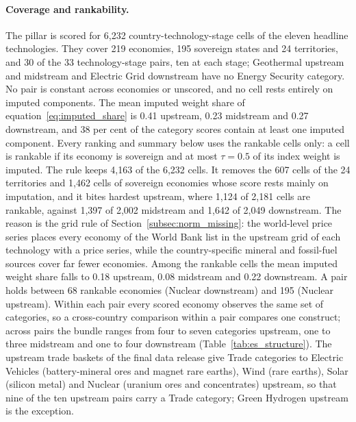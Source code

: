 
\paragraph{Coverage and rankability.} The pillar is scored for 6{,}232
country-technology-stage cells of the eleven headline technologies. They cover 219 economies,
195 sovereign states and 24 territories, and 30 of the 33 technology-stage pairs, ten at each
stage; Geothermal upstream and midstream and Electric Grid downstream have no Energy Security
category. No pair is constant across economies or unscored, and no cell rests entirely on
imputed components. The mean imputed weight share of equation~\eqref{eq:imputed_share} is 0.41
upstream, 0.23 midstream and 0.27 downstream, and 38 per cent of the category scores contain at
least one imputed component. Every ranking and summary below uses the rankable cells only: a
cell is rankable if its economy is sovereign and at most $\tau=0.5$ of its index weight is
imputed. The rule keeps 4{,}163 of the 6{,}232 cells. It removes the 607 cells of the 24
territories and 1{,}462 cells of sovereign economies whose score rests mainly on imputation, and
it bites hardest upstream, where 1{,}124 of 2{,}181 cells are rankable, against 1{,}397 of 2{,}002
midstream and 1{,}642 of 2{,}049 downstream. The reason is the grid rule of
Section~\ref{subsec:norm_missing}: the world-level price series places every economy of the
World Bank list in the upstream grid of each technology with a price series, while the
country-specific mineral and fossil-fuel sources cover far fewer economies. Among the rankable
cells the mean imputed weight share falls to 0.18 upstream, 0.08 midstream and 0.22 downstream.
A pair holds between 68 rankable economies (Nuclear downstream) and 195 (Nuclear upstream).
Within each pair every scored economy observes the same set of categories, so a cross-country
comparison within a pair compares one construct; across pairs the bundle ranges from four to
seven categories upstream, one to three midstream and one to four downstream
(Table~\ref{tab:es_structure}). The upstream trade baskets of the final data release give Trade
categories to Electric Vehicles (battery-mineral ores and magnet rare earths), Wind (rare
earths), Solar (silicon metal) and Nuclear (uranium ores and concentrates) upstream, so that nine
of the ten upstream pairs carry a Trade category; Green Hydrogen upstream is the exception.

